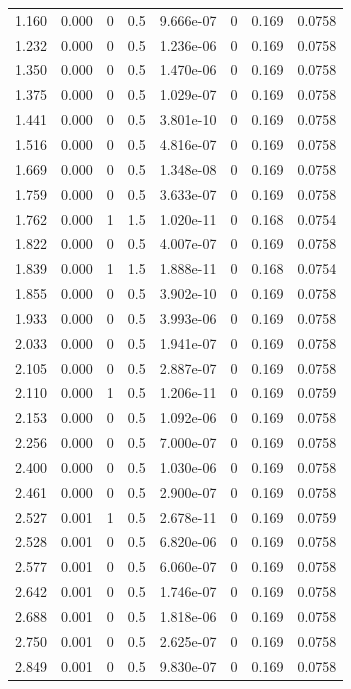 \documentclass[preview]{standalone}
\begin{document}
{{\begin{tabular}{L{1.2cm}C{1.2cm} C{0.3cm}C{0.5cm} C{1.4cm}C{1.4cm} C{1.4cm}C{1.4cm}}
  1.160  &  0.000  & 0     & 0.5 &  9.666e-07  & 0  & 0.169 &  0.0758   \\ 
  1.232  &  0.000  & 0     & 0.5 &  1.236e-06  & 0  & 0.169 &  0.0758   \\ 
  1.350  &  0.000  & 0     & 0.5 &  1.470e-06  & 0  & 0.169 &  0.0758   \\ 
  1.375  &  0.000  & 0     & 0.5 &  1.029e-07  & 0  & 0.169 &  0.0758   \\ 
  1.441  &  0.000  & 0     & 0.5 &  3.801e-10  & 0  & 0.169 &  0.0758   \\ 
  1.516  &  0.000  & 0     & 0.5 &  4.816e-07  & 0  & 0.169 &  0.0758   \\ 
  1.669  &  0.000  & 0     & 0.5 &  1.348e-08  & 0  & 0.169 &  0.0758   \\ 
  1.759  &  0.000  & 0     & 0.5 &  3.633e-07  & 0  & 0.169 &  0.0758   \\ 
  1.762  &  0.000  & 1     & 1.5 &  1.020e-11  & 0  & 0.168 &  0.0754   \\ 
  1.822  &  0.000  & 0     & 0.5 &  4.007e-07  & 0  & 0.169 &  0.0758   \\ 
  1.839  &  0.000  & 1     & 1.5 &  1.888e-11  & 0  & 0.168 &  0.0754   \\ 
  1.855  &  0.000  & 0     & 0.5 &  3.902e-10  & 0  & 0.169 &  0.0758   \\ 
  1.933  &  0.000  & 0     & 0.5 &  3.993e-06  & 0  & 0.169 &  0.0758   \\ 
  2.033  &  0.000  & 0     & 0.5 &  1.941e-07  & 0  & 0.169 &  0.0758   \\ 
  2.105  &  0.000  & 0     & 0.5 &  2.887e-07  & 0  & 0.169 &  0.0758   \\ 
  2.110  &  0.000  & 1     & 0.5 &  1.206e-11  & 0  & 0.169 &  0.0759   \\ 
  2.153  &  0.000  & 0     & 0.5 &  1.092e-06  & 0  & 0.169 &  0.0758   \\ 
  2.256  &  0.000  & 0     & 0.5 &  7.000e-07  & 0  & 0.169 &  0.0758   \\ 
  2.400  &  0.000  & 0     & 0.5 &  1.030e-06  & 0  & 0.169 &  0.0758   \\ 
  2.461  &  0.000  & 0     & 0.5 &  2.900e-07  & 0  & 0.169 &  0.0758   \\ 
  2.527  &  0.001  & 1     & 0.5 &  2.678e-11  & 0  & 0.169 &  0.0759   \\ 
  2.528  &  0.001  & 0     & 0.5 &  6.820e-06  & 0  & 0.169 &  0.0758   \\ 
  2.577  &  0.001  & 0     & 0.5 &  6.060e-07  & 0  & 0.169 &  0.0758   \\ 
  2.642  &  0.001  & 0     & 0.5 &  1.746e-07  & 0  & 0.169 &  0.0758   \\ 
  2.688  &  0.001  & 0     & 0.5 &  1.818e-06  & 0  & 0.169 &  0.0758   \\ 
  2.750  &  0.001  & 0     & 0.5 &  2.625e-07  & 0  & 0.169 &  0.0758   \\ 
  2.849  &  0.001  & 0     & 0.5 &  9.830e-07  & 0  & 0.169 &  0.0758   \\ 
\hline 
\end{tabular} 

}}
\end{document}
